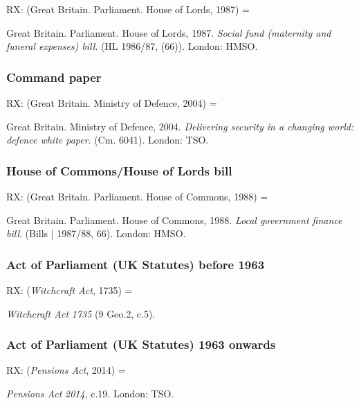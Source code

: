 RX: (Great Britain. Parliament. House of Lords, 1987) = \cite{gb.hl1986/87-66}

Great Britain. Parliament. House of Lords, 1987. \emph{Social fund (maternity and funeral expenses) bill}. (HL 1986/87, (66)). London: HMSO.



\subsubsection*{Command paper}

RX: (Great Britain. Ministry of Defence, 2004) = \cite{gb.cm6041}

Great Britain. Ministry of Defence, 2004. \emph{Delivering security in a changing world: defence white paper}. (Cm. 6041). London: TSO.




\subsubsection*{House of Commons\slash House of Lords bill}

RX: (Great Britain. Parliament. House of Commons, 1988) = \cite{gb.bill1987/88-66}

Great Britain. Parliament. House of Commons, 1988. \emph{Local government finance bill}. (Bills | 1987/88, 66). London: HMSO.



\subsubsection*{Act of Parliament (UK Statutes) before 1963}

RX: (\emph{Witchcraft Act}, 1735) = \cite{gb.wa1735}

\emph{Witchcraft Act} \emph{1735} (9 Geo.2, c.5).



\subsubsection*{Act of Parliament (UK Statutes) 1963 onwards}

RX: (\emph{Pensions Act}, 2014) = \cite{gb.pa2014}

\emph{Pensions Act} \emph{2014}, c.19. London: TSO.




